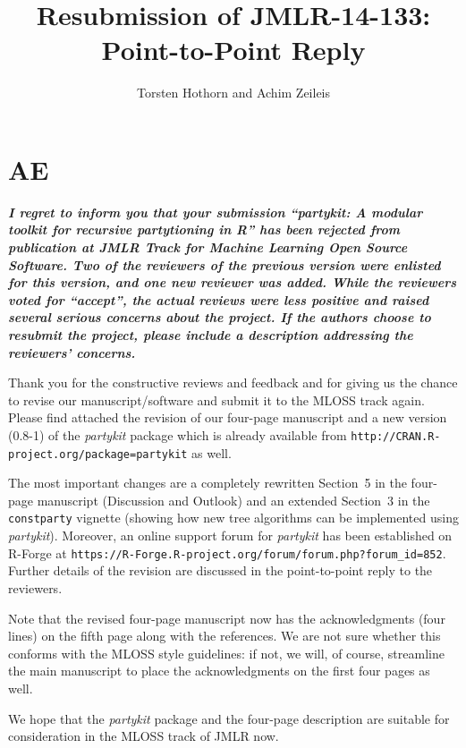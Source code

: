 \documentclass{article}
\title{Resubmission of JMLR-14-133: Point-to-Point Reply}
\author{Torsten Hothorn and Achim Zeileis}
\begin{document}
\maketitle

\section*{AE}

\textbf{\textit{%
I regret to inform you that your submission ``partykit: A modular toolkit
for recursive partytioning in R'' has been rejected from publication at JMLR
Track for Machine Learning Open Source Software.  Two of the reviewers of
the previous version were enlisted for this version, and one new reviewer
was added.  While the reviewers voted for ``accept'', the actual reviews
were less positive and raised several serious concerns about the project. 
If the authors choose to resubmit the project, please include a description
addressing the reviewers' concerns.
}}

\smallskip

Thank you for the constructive reviews and feedback and for giving us the
chance to revise our manuscript/software and submit it to the MLOSS track
again. Please find attached the revision of our four-page manuscript
and a new version (0.8-1) of the \emph{partykit} package which is already
available from \texttt{http://CRAN.R-project.org/package=partykit} as well.

The most important changes are a completely rewritten Section~5 in the four-page
manuscript (Discussion and Outlook) and an extended Section~3 in the \texttt{constparty}
vignette (showing how new tree algorithms can be implemented using \emph{partykit}).
Moreover, an online support forum for \emph{partykit} has been established
on \textsf{R}-Forge at \texttt{https://R-Forge.R-project.org/forum/forum.php?forum\_id=852}.
Further details of the revision are discussed in the point-to-point reply
to the reviewers.

Note that the revised four-page manuscript now has the acknowledgments (four lines)
on the fifth page along with the references. We are not sure whether this
conforms with the MLOSS style guidelines: if not, we will, of course, streamline
the main manuscript to place the acknowledgments on the first four pages as well.

We hope that the \emph{partykit} package and the four-page description are
suitable for consideration in the MLOSS track of JMLR now.
\end{document}
